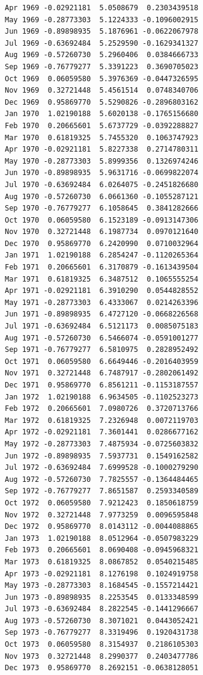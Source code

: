 \documentclass[
  11pt,
  a4paper,
]{report}
\begin{document}
\begin{verbatim}
Apr 1969 -0.02921181  5.0508679  0.2303439518
May 1969 -0.28773303  5.1224333 -0.1096002915
Jun 1969 -0.89898935  5.1876961 -0.0622067978
Jul 1969 -0.63692484  5.2529590 -0.1629341327
Aug 1969 -0.57260730  5.2960406  0.0384666733
Sep 1969 -0.76779277  5.3391223  0.3690705023
Oct 1969  0.06059580  5.3976369 -0.0447326595
Nov 1969  0.32721448  5.4561514  0.0748340706
Dec 1969  0.95869770  5.5290826 -0.2896803162
Jan 1970  1.02190188  5.6020138 -0.1765156680
Feb 1970  0.20665601  5.6737729 -0.0392288827
Mar 1970  0.61819325  5.7455320  0.1063747923
Apr 1970 -0.02921181  5.8227338  0.2714780311
May 1970 -0.28773303  5.8999356  0.1326974246
Jun 1970 -0.89898935  5.9631716 -0.0699822074
Jul 1970 -0.63692484  6.0264075 -0.2451826680
Aug 1970 -0.57260730  6.0661360 -0.1055287121
Sep 1970 -0.76779277  6.1058645  0.3841282666
Oct 1970  0.06059580  6.1523189 -0.0913147306
Nov 1970  0.32721448  6.1987734  0.0970121640
Dec 1970  0.95869770  6.2420990  0.0710032964
Jan 1971  1.02190188  6.2854247 -0.1120265364
Feb 1971  0.20665601  6.3170879 -0.1613439504
Mar 1971  0.61819325  6.3487512  0.1065555254
Apr 1971 -0.02921181  6.3910290  0.0544828552
May 1971 -0.28773303  6.4333067  0.0214263396
Jun 1971 -0.89898935  6.4727120 -0.0668226568
Jul 1971 -0.63692484  6.5121173  0.0085075183
Aug 1971 -0.57260730  6.5466074 -0.0591001277
Sep 1971 -0.76779277  6.5810975  0.2828952492
Oct 1971  0.06059580  6.6649446 -0.2016403959
Nov 1971  0.32721448  6.7487917 -0.2802061492
Dec 1971  0.95869770  6.8561211 -0.1153187557
Jan 1972  1.02190188  6.9634505 -0.1102523273
Feb 1972  0.20665601  7.0980726  0.3720713766
Mar 1972  0.61819325  7.2326948  0.0072119703
Apr 1972 -0.02921181  7.3601441  0.0286677162
May 1972 -0.28773303  7.4875934 -0.0725603832
Jun 1972 -0.89898935  7.5937731  0.1549162582
Jul 1972 -0.63692484  7.6999528 -0.1000279290
Aug 1972 -0.57260730  7.7825557 -0.1364484465
Sep 1972 -0.76779277  7.8651587  0.2593340589
Oct 1972  0.06059580  7.9212423  0.1850618759
Nov 1972  0.32721448  7.9773259  0.0096595848
Dec 1972  0.95869770  8.0143112 -0.0044088865
Jan 1973  1.02190188  8.0512964 -0.0507983229
Feb 1973  0.20665601  8.0690408 -0.0945968321
Mar 1973  0.61819325  8.0867852  0.0540215485
Apr 1973 -0.02921181  8.1276198  0.1024919758
May 1973 -0.28773303  8.1684545 -0.1557214421
Jun 1973 -0.89898935  8.2253545  0.0133348599
Jul 1973 -0.63692484  8.2822545 -0.1441296667
Aug 1973 -0.57260730  8.3071021  0.0443052421
Sep 1973 -0.76779277  8.3319496  0.1920431738
Oct 1973  0.06059580  8.3154937  0.2186105303
Nov 1973  0.32721448  8.2990377  0.2403477786
Dec 1973  0.95869770  8.2692151 -0.0638128051

\end{verbatim}
\end{document}
